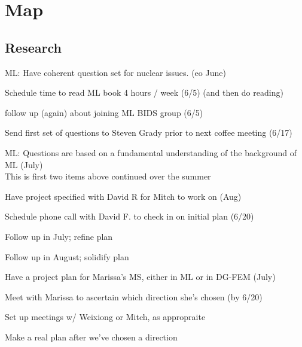 \documentclass[12pt,twoside]{article}
\begin{document}
\section{Map}
\subsection{Research}
\begin{compactitem}
\item ML: Have coherent question set for nuclear issues. (eo June)
  \begin{compactitem}
  \item Schedule time to read ML book 4 hours / week (6/5) (and then do reading)
  \item follow up (again) about joining ML BIDS group (6/5)
  \item Send first set of questions to Steven Grady prior to next coffee meeting (6/17)
  \end{compactitem}  

\item ML: Questions are based on a fundamental understanding of the background of ML (July)\\
\hspace*{2em} This is first two items above continued over the summer

\item Have project specified with David R for Mitch to work on (Aug)
  \begin{compactitem}
  \item Schedule phone call with David F. to check in on initial plan (6/20)
  \item Follow up in July; refine plan
  \item Follow up in August; solidify plan
  \end{compactitem}
  
\item Have a project plan for Marissa's MS, either in ML or in DG-FEM (July)
  \begin{compactitem}
  \item Meet with Marissa to ascertain which direction she's chosen (by 6/20)
  \item Set up meetings w/ Weixiong or Mitch, as appropraite
  \item Make a real plan after we've chosen a direction
  \end{compactitem}


\end{compactitem}
\end{document}
